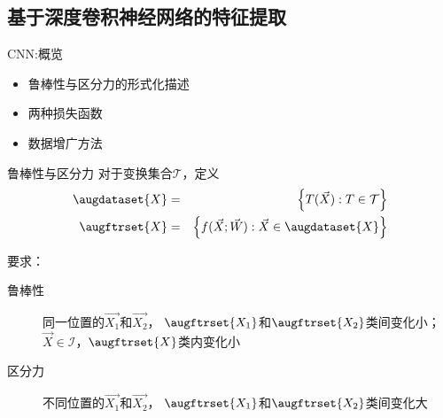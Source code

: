 \documentclass {beamer}
\begin{document}
\subsection{基于深度卷积神经网络的特征提取}

\begin{frame}{CNN:概览}
    \begin{itemize}
        \item 鲁棒性与区分力的形式化描述
        \item 两种损失函数
        \item 数据增广方法
    \end{itemize}
\end{frame}

\begin{frame}{鲁棒性与区分力}
    对于变换集合$\mathcal{T}$，定义
    \begin{eqnarray}
        \augdataset{X} &=& \left\{T(\vec{X}): T\in\mathcal{T}\right\}
            \nonumber \\
        \augftrset{X} &=& \left\{f(\vec{X};\vec{W}):
        \vec{X}\in\augdataset{X}\right\} \label{eqn:cnn:augdef}
    \end{eqnarray}

    要求：
    \begin{description}
        \item[鲁棒性] 同一位置的$\vec{X_1}$和$\vec{X_2}$，
            $\augftrset{X_1}$和$\augftrset{X_2}$类间变化\alert{小}；
            $\vec{X}\in\mathcal{I}$，$\augftrset{X}$类内变化小
        \item[区分力] 不同位置的$\vec{X_1}$和$\vec{X_2}$，
            $\augftrset{X_1}$和$\augftrset{X_2}$类间变化\alert{大}
    \end{description}

\end{frame}
\end{document}
